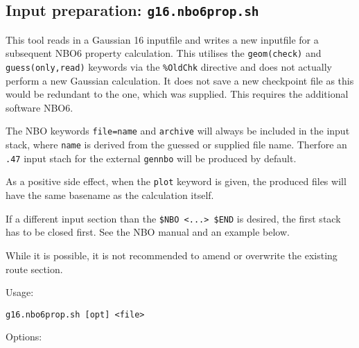 \documentclass[   %
  final,          %
  a4paper         %
]{article}
\begin{document}
\subsection{Input preparation: \texorpdfstring{{\lstinline`g16.nbo6prop.sh`}}{g16.nbo6prop.sh}}
\label{sec:g16.nbo6prop}

This tool reads in a Gaussian 16 inputfile and writes a new inputfile for a subsequent NBO6 
property calculation. This utilises the \texttt{geom(check)} and \texttt{guess(only,read)} keywords
via the \texttt{\%OldChk} directive and does not actually perform a new Gaussian calculation.
It does not save a new checkpoint file as this would be redundant to the one, which was supplied.
This requires the additional software NBO6.

The NBO keywords \texttt{file=name} and \texttt{archive} will always be included in the 
input stack, where \texttt{name} is derived from the guessed or supplied file name.
Therfore an \texttt{.47} input stach for the external \texttt{gennbo} will be produced
by default.

As a positive side effect, when the \texttt{plot} keyword is given, the produced files
will have the same basename as the calculation itself.

If a different input section than the \texttt{\$NBO <...> \$END} is desired, the first stack 
has to be closed first. See the NBO manual and an example below.

While it is possible, it is not recommended to amend or overwrite the existing route section.

Usage: 

\lstinline`g16.nbo6prop.sh [opt] <file>`

Options:
\end{document}
